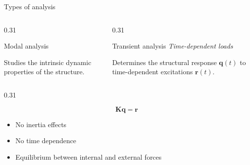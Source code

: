 \documentclass[aspectratio=169]{beamer}
\begin{document}
{{\begin{frame}{Types of analysis}
\begin{columns}[T,onlytextwidth]
\begin{column}{0.31\textwidth}
\begin{block}{Modal analysis}
            \vspace{0.25cm}

            Studies the intrinsic dynamic properties of the structure.
          \end{block}
        \end{column}

        \begin{column}{0.31\textwidth}

          \begin{block}{Transient analysis}
            \centering
            \small
            \emph{Time-dependent loads}

            \vspace{0.25cm}

            Determines the structural response
            $\mathbf q(t)$ to time-dependent excitations
            $\mathbf r(t)$.
          \end{block}
        \end{column}
      \end{columns}

      \vspace{-0.5cm}

      \begin{columns}[T,onlytextwidth]
        \begin{column}{0.31\textwidth}
          \begin{block}{}
            \centering
            \small
            \[
              \mathbf K\mathbf q=\mathbf r
            \]
            \vspace{-0.45cm}
            \footnotesize
            \begin{itemize}
              \item No inertia effects
              \item No time dependence
              \item Equilibrium between internal and external forces
            \end{itemize}
          \end{block}
        \end{column}


\end{columns}
\end{frame}}}
\end{document}
